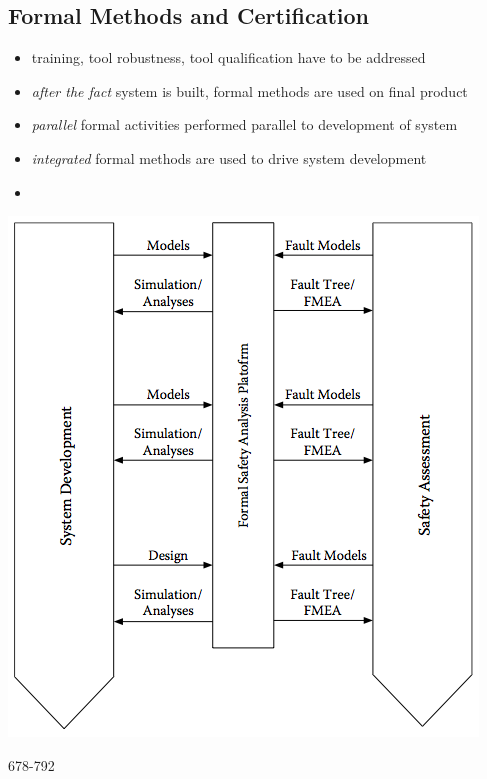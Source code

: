 \documentclass[a4paper, 10pt]{article}
\begin{document}
\subsection*{Formal Methods and Certification}
\begin{itemize}
    \item training, tool robustness, tool qualification \follows have to be addressed
    \item \emph{after the fact} system is built, formal methods are used on final product
    \item \emph{parallel} formal activities performed parallel to development of system
    \item \emph{integrated} formal methods are used to drive system development
    \item
\end{itemize}
\begin{center}
    \includegraphics[width=.5\linewidth]{images/safetyDev.png}
\end{center}








678-792
\end{document}
